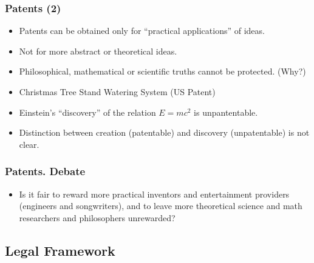 \begin{frame}
\frametitle{Patents (2)}

\begin{itemize}

\item Patents can be obtained only for ``practical applications'' of ideas.
\item Not for more abstract or theoretical ideas.
\item Philosophical, mathematical or scientific truths cannot be protected. (Why?)
\item Christmas Tree Stand Watering System (US Patent)
\item Einstein’s ``discovery'' of the relation $E=mc^2$ is unpantentable.
\item Distinction between \alert{creation} (patentable) and \alert{discovery} (unpatentable) is not clear­.
\end{itemize}

\end{frame}



\begin{frame}
\frametitle{Patents. Debate}

\begin{itemize}
\item Is it fair to reward more \alert{practical inventors} and entertainment providers (engineers and song­writers), and to leave more \alert{theoretical science} and \alert{math researchers} and \alert{philosophers} unrewarded?


\end{itemize}

\end{frame}



\subsection{Legal Framework}

